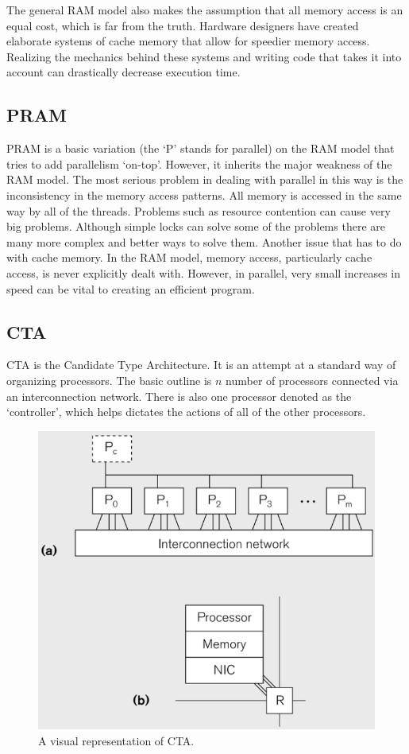 \documentclass{article}
\begin{document}
	The general RAM model also makes the assumption that all memory access is an equal cost, which is far from the truth. Hardware designers have created elaborate systems of cache memory that allow for speedier memory access. Realizing the mechanics behind these systems and writing code that takes it into account can drastically decrease execution time.
	
    \subsection{PRAM}
      PRAM is a basic variation (the `P' stands for parallel) on the RAM model that tries to add parallelism `on-top'. However, it inherits the major weakness of the RAM model. The most serious problem in dealing with parallel in this way is the inconsistency in the memory access patterns. All memory is accessed in the same way by all of the threads. Problems such as resource contention can cause very big problems. Although simple locks can solve some of the problems there are many more complex and better ways to solve them. Another issue that has to do with cache memory. In the RAM model, memory access, particularly cache access, is never explicitly dealt with. However, in parallel, very small increases in speed can be vital to creating an efficient program.
    \subsection{CTA}
    CTA is the Candidate Type Architecture. It is an attempt at a standard way of organizing processors. The basic outline is $n$ number of processors connected via an interconnection network. There is also one processor denoted as the `controller', which helps dictates the actions of all of the other processors.
	
	\done{}
	\begin{figure}[h]
    \centering
    \includegraphics[scale=.45]{pic/CTA.jpg}
    \caption{A visual representation of CTA.}
    \end{figure}
	
\end{document}
